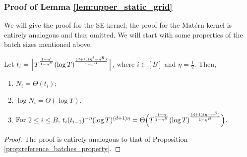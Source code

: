 \documentclass[10pt]{article}
\begin{document}
\subsubsection{Proof of Lemma \ref{lem:upper_static_grid}}
\label{app:proof_upper_fix_b}

We will give the proof for the SE kernel; the proof for the Mat\'ern kernel is entirely analogous and thus omitted. We will start with some properties of the batch sizes mentioned above.

\begin{proposition}
    \label{prop:property_static_grid}
    Let $t_i = \Bigl\lceil T^{\frac{1-\eta^i}{1-\eta^B}}(\log T)^{\frac{(d+1)(\eta^i- \eta^B)}{1-\eta^B}}\Bigr\rceil$, where $i\in[B]$ and $\eta=\frac{1}{2} $. Then,
    \begin{enumerate}
        \item $N_i=\Theta(t_i)$;
        \item $\log N_i=\Theta(\log T)$.
        \item For $2\leq i\leq B$, $t_i(t_{i-1})^{-\eta}(\log T)^{(d+1)\eta}=\Theta\Bigl(T^{\frac{1-\eta}{1-\eta^B}}(\log T)^{\frac{(d+1)(\eta-\eta^B)}{1-\eta^B}}\Bigr)$.
    \end{enumerate}
\end{proposition}
\begin{proof}
    The proof is entirely analogous to that of Proposition \ref{prop:reference_batches_property}.
\end{proof}
\end{document}
